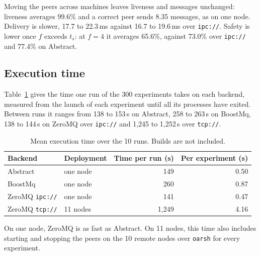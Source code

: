 \documentclass[11pt,a4paper]{article}
\newcommand{\code}[1]{\texttt{#1}}
\begin{document}
Moving the peers across machines leaves liveness and messages unchanged: liveness averages 99.6\%
and a correct peer sends 8.35 messages, as on one node. Delivery is slower, 17.7 to 22.3\,ms against
16.7 to 19.6\,ms over \code{ipc://}. Safety is lower once $f$ exceeds $t_s$: at $f = 4$ it averages
65.6\%, against 73.0\% over \code{ipc://} and 77.4\% on Abstract.

\subsection{Execution time}

Table~\ref{tab:time} gives the time one run of the 300 experiments takes on each backend, measured
from the launch of each experiment until all its processes have exited. Between runs it ranges from
138 to 153\,s on Abstract, 258 to 263\,s on BoostMq, 138 to 144\,s on ZeroMQ over \code{ipc://} and
1,245 to 1,252\,s over \code{tcp://}.

\begin{table}[!htbp]
  \centering
  \begin{tabular}{llrr}
    \toprule
    Backend & Deployment & Time per run (s) & Per experiment (s) \\
    \midrule
    Abstract & one node & 149 & 0.50 \\
    BoostMq & one node & 260 & 0.87 \\
    ZeroMQ \code{ipc://} & one node & 141 & 0.47 \\
    ZeroMQ \code{tcp://} & 11 nodes & 1,249 & 4.16 \\
    \bottomrule
  \end{tabular}
  \caption{Mean execution time over the 10 runs. Builds are not included.}
  \label{tab:time}
\end{table}

On one node, ZeroMQ is as fast as Abstract. On 11 nodes, this time also includes starting and
stopping the peers on the 10 remote nodes over \code{oarsh} for every experiment.



\end{document}
